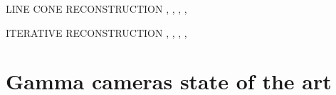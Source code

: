 LINE CONE RECONSTRUCTION \parencite{Cree1994}, \parencite{Basko1998}, \parencite{Parra1999}, \parencite{Hirasawa2003}, \parencite{Maxim2009} 

ITERATIVE RECONSTRUCTION \parencite{Schone2010}, \parencite{Zoglauer2011}, \parencite{Gillam2011}, \parencite{Lojacono2013}, \parencite{Mackin2012}

\section{Gamma cameras state of the art}

\clearpage
